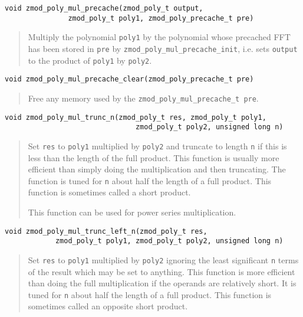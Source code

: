 \documentclass[a4paper,10pt]{article}
\newcommand{\code}{\lstinline}
\begin{document}
\begin{lstlisting}
void zmod_poly_mul_precache(zmod_poly_t output,
               zmod_poly_t poly1, zmod_poly_precache_t pre)
\end{lstlisting}
\begin{quote}
Multiply the polynomial \code{poly1} by the polynomial whose precached FFT has been stored in \code{pre} by \code{zmod_poly_mul_precache_init}, i.e. sets \code{output} to the product of \code{poly1} by \code{poly2}. 
\end{quote}

\begin{lstlisting}
void zmod_poly_mul_precache_clear(zmod_poly_precache_t pre)
\end{lstlisting}
\begin{quote}
Free any memory used by the \code{zmod_poly_mul_precache_t pre}.
\end{quote}

\begin{lstlisting}
void zmod_poly_mul_trunc_n(zmod_poly_t res, zmod_poly_t poly1, 
                               zmod_poly_t poly2, unsigned long n)
\end{lstlisting}
\begin{quote}
Set \code{res} to \code{poly1} multiplied by \code{poly2} and truncate to length \code{n} if this is less than the length of the full product. This function is usually more efficient than simply doing the multiplication and then truncating. The function is tuned for \code{n} about half the length of a full product. This function is sometimes called a short product.

This function can be used for power series multiplication.
\end{quote}

\begin{lstlisting}
void zmod_poly_mul_trunc_left_n(zmod_poly_t res, 
            zmod_poly_t poly1, zmod_poly_t poly2, unsigned long n)
\end{lstlisting}
\begin{quote}
Set \code{res} to \code{poly1} multiplied by \code{poly2} ignoring the least significant \code{n} terms of the result which may be set to anything. This function is more efficient than doing the full multiplication if the operands are relatively short. It is tuned for \code{n} about half the length of a full product. This function is sometimes called an opposite short product. 
\end{quote}
\end{document}
